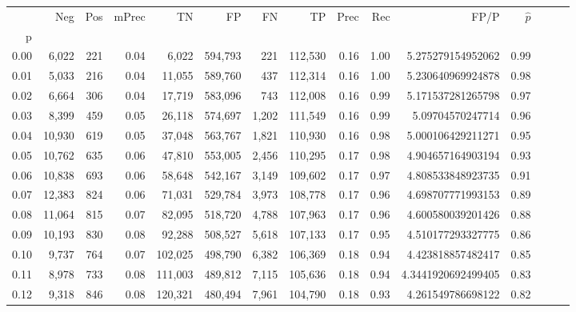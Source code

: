 \begin{tabular}{rrrrrrrrrrrrrrr}
\toprule
{} &     Neg &    Pos & mPrec &       TN &       FP &       FN &       TP &  Prec &   Rec &                  FP/P & $\hat{p}$ \\
p    &         &        &       &          &          &          &          &       &       &                       &           \\
\midrule
0.00 &   6,022 &    221 &  0.04 &    6,022 &  594,793 &      221 &  112,530 &  0.16 &  1.00 &     5.275279154952062 &      0.99 \\
0.01 &   5,033 &    216 &  0.04 &   11,055 &  589,760 &      437 &  112,314 &  0.16 &  1.00 &     5.230640969924878 &      0.98 \\
0.02 &   6,664 &    306 &  0.04 &   17,719 &  583,096 &      743 &  112,008 &  0.16 &  0.99 &     5.171537281265798 &      0.97 \\
0.03 &   8,399 &    459 &  0.05 &   26,118 &  574,697 &    1,202 &  111,549 &  0.16 &  0.99 &      5.09704570247714 &      0.96 \\
0.04 &  10,930 &    619 &  0.05 &   37,048 &  563,767 &    1,821 &  110,930 &  0.16 &  0.98 &     5.000106429211271 &      0.95 \\
0.05 &  10,762 &    635 &  0.06 &   47,810 &  553,005 &    2,456 &  110,295 &  0.17 &  0.98 &     4.904657164903194 &      0.93 \\
0.06 &  10,838 &    693 &  0.06 &   58,648 &  542,167 &    3,149 &  109,602 &  0.17 &  0.97 &     4.808533848923735 &      0.91 \\
0.07 &  12,383 &    824 &  0.06 &   71,031 &  529,784 &    3,973 &  108,778 &  0.17 &  0.96 &     4.698707771993153 &      0.89 \\
0.08 &  11,064 &    815 &  0.07 &   82,095 &  518,720 &    4,788 &  107,963 &  0.17 &  0.96 &     4.600580039201426 &      0.88 \\
0.09 &  10,193 &    830 &  0.08 &   92,288 &  508,527 &    5,618 &  107,133 &  0.17 &  0.95 &     4.510177293327775 &      0.86 \\
0.10 &   9,737 &    764 &  0.07 &  102,025 &  498,790 &    6,382 &  106,369 &  0.18 &  0.94 &     4.423818857482417 &      0.85 \\
0.11 &   8,978 &    733 &  0.08 &  111,003 &  489,812 &    7,115 &  105,636 &  0.18 &  0.94 &    4.3441920692499405 &      0.83 \\
0.12 &   9,318 &    846 &  0.08 &  120,321 &  480,494 &    7,961 &  104,790 &  0.18 &  0.93 &     4.261549786698122 &      0.82 \\

\end{tabular}
